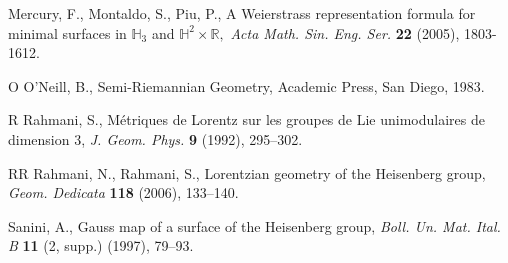 \documentclass[11pt]{amsart}
\begin{document}
\begin{thebibliography}{9}
  Mercury, F., Montaldo, S., Piu, P., A
Weierstrass representation formula for minimal surfaces in
${\mathbb{H}}_3$ and ${\mathbb{H}}^2\times{\mathbb{R}},$ \textsl{ Acta Math. Sin. Eng.
Ser.} \textbf{22} (2005), 1803-1612.

\bibitem
{O}
O'Neill, B., Semi-Riemannian Geometry, Academic Press, San Diego,
1983.

\bibitem
{R}
Rahmani, S., M\'etriques de Lorentz sur les groupes de Lie
unimodulaires de dimension 3, \textsl{J. Geom. Phys.} \textbf{9}
(1992), 295--302.

\bibitem
{RR}
Rahmani, N., Rahmani, S., Lorentzian geometry of the Heisenberg
group, \textsl{Geom. Dedicata} \textbf{118} (2006), 133--140.

  Sanini, A., Gauss map of a surface of the Heisenberg
group, \textsl{Boll. Un. Mat. Ital. B} \textbf{11} (2, supp.)
(1997), 79--93.

\end{thebibliography}
\end{document}
